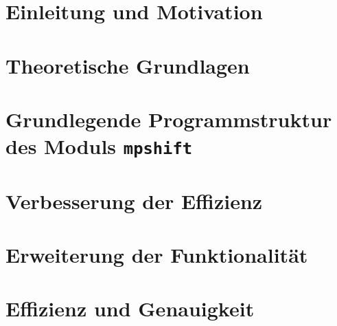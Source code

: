 \documentclass[
  paper=A4, 		%
  pagesize, 		%
  DIV=12, 		%
  ngerman,  		%
  12pt, 			%
  listof=totoc, 
  bibliography=totoc, 
  index=totoc, 
  openany, 
]{scrbook}
\begin{document}
\newcommand{\iu}{\mathrm{i}\mkern1mu}
\newcommand*\diff{\mathop{}\!\mathrm{d}}
\newcommand*\Diff[1]{\mathop{}\!\mathrm{d^#1}}

\frontmatter
 
\restoregeometry
\thispagestyle{empty}
\cleardoublepage

%  



\setcounter{secnumdepth}{5}
\setcounter{tocdepth}{5}
\tableofcontents

\mainmatter %

\chapter{Einleitung und Motivation}\label{einleitung}


\chapter{Theoretische Grundlagen}\label{theorie}


\chapter{Grundlegende Programmstruktur des Moduls \texttt{mpshift}}\label{programmstruktur}


\chapter{Verbesserung der Effizienz}\label{effizienz}


\chapter{Erweiterung der Funktionalität}\label{funktionalität}


\chapter{Effizienz und Genauigkeit}\label{genauigkeit}

\end{document}
